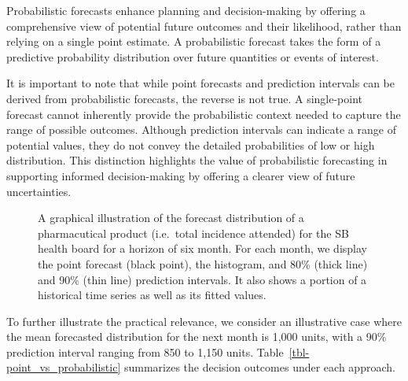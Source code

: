 \documentclass[
  authoryear,
  preprint,
  3p]{elsarticle}
\begin{document}
Probabilistic forecasts enhance planning and decision-making by offering
a comprehensive view of potential future outcomes and their likelihood,
rather than relying on a single point estimate. A probabilistic forecast
takes the form of a predictive probability distribution over future
quantities or events of interest.

It is important to note that while point forecasts and prediction
intervals can be derived from probabilistic forecasts, the reverse is
not true. A single-point forecast cannot inherently provide the
probabilistic context needed to capture the range of possible outcomes.
Although prediction intervals can indicate a range of potential values,
they do not convey the detailed probabilities of low or high
distribution. This distinction highlights the value of probabilistic
forecasting in supporting informed decision-making by offering a clearer
view of future uncertainties.

\begin{figure}[H]


\caption{\label{fig-forecast-density-hstep}A graphical illustration of
the forecast distribution of a pharmacutical product (i.e.~total
incidence attended) for the SB health board for a horizon of six month.
For each month, we display the point forecast (black point), the
histogram, and 80\% (thick line) and 90\% (thin line) prediction
intervals. It also shows a portion of a historical time series as well
as its fitted values.}

\end{figure}%

To further illustrate the practical relevance, we consider an
illustrative case where the mean forecasted distribution for the next
month is 1,000 units, with a 90\% prediction interval ranging from 850
to 1,150 units. Table~\ref{tbl-point_vs_probabilistic} summarizes the
decision outcomes under each approach.
\end{document}
